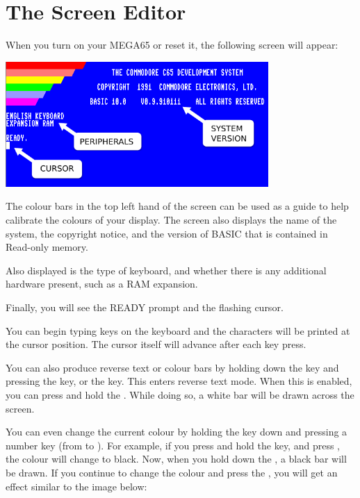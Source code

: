 \section{The Screen Editor}
\label{sec:screen-editor}

When you turn on your MEGA65 or reset it, the following screen will appear:

\begin{center}
\includegraphics[width={10cm}]{images/introduction-screen/layout.png}
\end{center}

The colour bars in the top left hand of the screen can be used as a guide to help calibrate the colours of your display. The screen also displays the name of the system, the copyright notice, and the version of BASIC that is contained in Read-only memory.

Also displayed is the type of keyboard, and whether there is any additional hardware present, such as a RAM expansion.

Finally, you will see the READY prompt and the flashing cursor.

You can begin typing keys on the keyboard and the characters will be printed at the cursor position. The cursor itself will advance after each key press.

You can also produce reverse text or colour bars by holding down the  key and pressing the  key, or the  key. This enters reverse text mode. When this is enabled, you can press and hold the . While doing so, a white bar will be drawn across the screen.

You can even change the current colour by holding the  key down and pressing a number key (from  to ). For example, if you press and hold the  key, and press , the colour will change to black. Now, when you hold down the , a black bar will be drawn. If you continue to change the colour and press the , you will get an effect similar to the image below:


